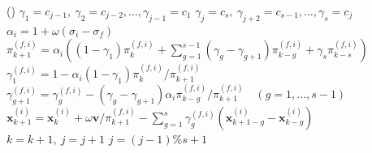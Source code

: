 \begin{algorithm}[H]\ContinuedFloat\caption[]{}\begin{algorithmic}[1]
\State ()
\State $\gamma_1=c_{j-1},\ \gamma_2=c_{j-2},\ldots,\gamma_{j-1}=c_1$
\State $\gamma_j=c_s,\ \gamma_{j+2}=c_{s-1},\ldots,\gamma_s=c_j$
\State $\alpha_i=1+\omega(\sigma_i-\sigma_f)$
\State $\pi_{k+1}^{(f,i)}=\alpha_i\left((1-\gamma_1)\pi_k^{(f,i)}+\sum_{g=1}^{s-1}(\gamma_g-\gamma_{g+1})\pi_{k-g}^{(f,i)}+\gamma_s\pi_{k-s}^{(f,i)}\right)$
\State $\gamma_1^{(f,i)}=1-\alpha_i(1-\gamma_1)\pi_k^{(f,i)}/\pi_{k+1}^{(f,i)}$
\State $\gamma_{g+1}^{(f,i)}=\gamma_g^{(f,i)}-(\gamma_g-\gamma_{g+1})\alpha_i\pi_{k-g}^{(f,i)}/\pi_{k+1}^{(f,i)}\quad(g=1,\ldots,s-1)$
\State $\bm x_{k+1}^{(i)}=\bm x_k^{(i)}+\omega\bm v/\pi_{k+1}^{(f,i)}-\sum_{g=1}^{s}\gamma_g^{(f,i)}(\bm x_{k+1-g}^{(i)}-\bm x_{k-g}^{(i)})$
\EndIf\EndFor
\State $k=k+1,\ j=j+1$
\State $j=(j-1)\%s+1$ 
\EndFor\EndWhile\end{algorithmic}\end{algorithm}
